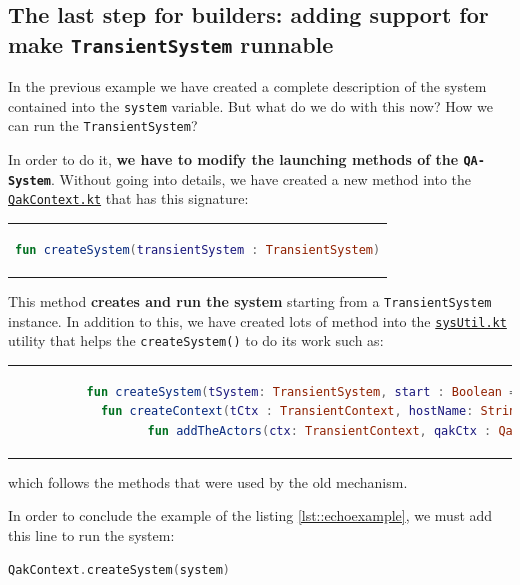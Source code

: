 \subsection{The last step for builders: adding support for make \texttt{TransientSystem} runnable}

In the previous example we have created a complete description of the system contained into the \verb*|system| variable. But what do we do with this now? How we can run the \texttt{TransientSystem}?

In order to do it, \textbf{we have to modify the launching methods of the \texttt{QA-System}}.
Without going into details, we have created a new method into the \href{https://github.com/LM-96/QA-Extensions/blob/main/it.unibo.qakactor/src/main/kotlin/QakContext.kt}{\texttt{QakContext.kt}} that has this signature:

\begin{center}
	\begin{tabular}{c}
		\begin{lstlisting}[frame=none,numbers=none,language=Kotlin]
			fun createSystem(transientSystem : TransientSystem)
		\end{lstlisting}
	\end{tabular}
\end{center}

This method \textcolor{BrickRed}{\textbf{creates and run the system}} starting from a \texttt{TransientSystem} instance.
In addition to this, we have created lots of method into the \href{https://github.com/LM-96/QA-Extensions/blob/main/it.unibo.qakactor/src/main/kotlin/sysUtil.kt}{\texttt{sysUtil.kt}} utility that helps the \verb|createSystem()| to do its work such as:
\begin{center}
	\begin{tabular}{c}
		\begin{lstlisting}[frame=none,numbers=none,language=Kotlin]
			fun createSystem(tSystem: TransientSystem, start : Boolean = true)
			fun createContext(tCtx : TransientContext, hostName: String) : QakContext?
			fun addTheActors(ctx: TransientContext, qakCtx : QakContext )
		\end{lstlisting}
	\end{tabular}
\end{center}
which follows the methods that were used by the old mechanism.

In order to conclude the example of the listing \ref{lst::echoexample}, we must add this line to run the system:
\begin{lstlisting}[language=Kotlin]
	QakContext.createSystem(system)
\end{lstlisting}


